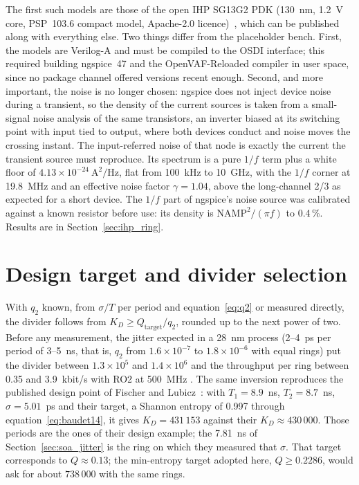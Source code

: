 The first such models are those of the open IHP SG13G2 \ac{PDK} (130~nm,
1.2~V core, PSP~103.6 compact model, Apache-2.0
licence)~\cite{ihp_openpdk_repo}, which can be published along with
everything else. Two things differ from the placeholder bench. First, the
models are Verilog-A and must be compiled to the OSDI interface; this
required building ngspice~47 and the OpenVAF-Reloaded compiler in user
space, since no package channel offered versions recent enough. Second,
and more important, the noise is no longer chosen: ngspice does not
inject device noise during a transient, so the density of the current
sources is taken from a small-signal noise analysis of the same
transistors, an inverter biased at its switching point with input tied to
output, where both devices conduct and noise moves the crossing instant.
The input-referred noise of that node is exactly the current the
transient source must reproduce. Its spectrum is a pure $1/f$ term plus a
white floor of $4.13\times10^{-24}~\mathrm{A^2/Hz}$, flat from 100~kHz to
10~GHz, with the $1/f$ corner at 19.8~MHz and an effective noise factor
$\gamma = 1.04$, above the long-channel 2/3 as expected for a short
device. The $1/f$ part of ngspice's noise source was calibrated against a
known resistor before use: its density is $\mathrm{NAMP}^2/(\pi f)$ to
0.4\,\%. Results are in Section~\ref{sec:ihp_ring}.

\section{Design target and divider selection}
\label{sec:kd}

With $q_2$ known, from $\sigma/T$ per period and equation~\eqref{eq:q2}
or measured directly, the divider follows from
$K_D \ge Q_{\mathrm{target}} / q_2$, rounded up to the next power of two.
Before any measurement, the jitter expected in a 28~nm process (2--4~ps
per period of 3--5~ns, that is, $q_2$ from $1.6\times10^{-7}$ to
$1.8\times10^{-6}$ with equal rings) put the divider between
$1.3\times10^5$ and $1.4\times10^6$ and the throughput per ring between
0.35 and 3.9~kbit/s with RO2 at 500~MHz \est{}. The same inversion
reproduces the published design
point of Fischer and Lubicz~\cite{fischer_2014_embedded}: with
$T_1 = 8.9$~ns, $T_2 = 8.7$~ns, $\sigma = 5.01$~ps and their target, a
Shannon entropy of 0.997 through equation~\eqref{eq:baudet14}, it gives
$K_D = 431\,153$ against their $K_D \approx 430\,000$. Those periods are
the ones of their design example; the 7.81~ns of
Section~\ref{sec:soa_jitter} is the ring on which they measured that
$\sigma$. That target
corresponds to $Q \approx 0.13$; the min-entropy target adopted here,
$Q \ge 0.2286$, would ask for about $738\,000$ with the same rings.

